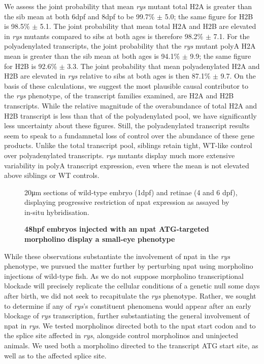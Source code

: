 We assess the joint probability that mean \textit{rys} mutant total H2A is greater than the sib mean at both 6dpf and 8dpf to be 99.7\% $\pm$ 5.0; the same figure for H2B is 98.5\% $\pm$ 5.1. The joint probability that mean total H2A and H2B are elevated in \textit{rys} mutants compared to sibs at both ages is therefore 98.2\% $\pm$ 7.1. For the polyadenylated transcripts, the joint probability that the \textit{rys} mutant polyA H2A mean is greater than the sib mean at both ages is 94.1\% $\pm$ 9.9; the same figure for H2B is 92.6\% $\pm$ 3.3. The joint probability that mean polyadenylated H2A and H2B are elevated in \textit{rys} relative to sibs at both ages is then 87.1\% $\pm$ 9.7. On the basis of these calculations, we suggest the most plausible causal contributor to the \textit{rys} phenotype, of the transcript families examined, are H2A and H2B transcripts. While the relative magnitude of the overabundance of total H2A and H2B transcript is less than that of the polyadenylated pool, we have significantly less uncertainty about these figures. Still, the polyadenylated transcript results seem to speak to a fundamnetal loss of control over the abundance of these gene products. Unlike the total transcript pool, siblings retain tight, WT-like control over polyadenylated transcripts. \textit{rys} mutants display much more extensive variability in polyA transcript expression, even where the mean is not elevated above siblings or WT controls.

\begin{figure}[!h]
    \caption{{\bf 48hpf embryos injected with an npat ATG-targeted morpholino display a small-eye phenotype}}
    20\si{\micro\metre} sections of wild-type embryo (1dpf) and retinae (4 and 6 dpf), displaying progressive restriction of npat expression as assayed by in-situ hybridisation.
    \label{morpholinopics}
\end{figure}

While these observations substantiate the involvement of npat in the \textit{rys} phenotype, we pursued the matter further by perturbing npat using morpholino injections of wild-type fish. As we do not suppose morpholino transcriptional blockade will precisely replicate the cellular conditions of a genetic null some days after birth, we did not seek to recapitulate the \textit{rys} phenotype. Rather, we sought to determine if any of \textit{rys}'s constituent phenomena would appear after an early blockage of \textit{rys} transcription, further substantiating the general involvement of npat in \textit{rys}. We tested morpholinos directed both to the npat start codon and to the splice site affected in \textit{rys}, alongside control morpholinos and uninjected animals. We used both a morpholino directed to the transcript ATG start site, as well as to the affected splice site. 

